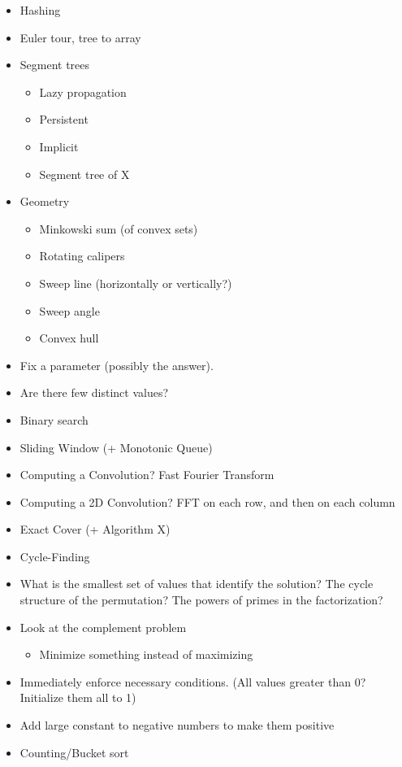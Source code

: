 \documentclass[9pt,a4paper,landscape,oneside]{amsart}
\newenvironment{myitemize}
{\begin{itemize}[leftmargin=.3cm]
	\setlength{\itemsep}{0pt}
	\setlength{\parskip}{0pt}
	\setlength{\parsep}{0pt}     }
{ \end{itemize}                  }
\begin{document}
\begin{multicols*}{3}
\begin{myitemize}
\begin{myitemize}
			\item Trie (maybe over something weird, like bits)
			\item Suffix array
			\item Suffix automaton (+DP?)
			\item Aho-Corasick
			\item eerTree
			\item Work with $S+S$
		\end{myitemize}
	\item Hashing
	\item Euler tour, tree to array
	\item Segment trees
		\begin{myitemize}
			\item Lazy propagation
			\item Persistent
			\item Implicit
			\item Segment tree of X
		\end{myitemize}
	\item Geometry
		\begin{myitemize}
			\item Minkowski sum (of convex sets)
			\item Rotating calipers
			\item Sweep line (horizontally or vertically?)
			\item Sweep angle
			\item Convex hull
		\end{myitemize}
	\item Fix a parameter (possibly the answer).
	\item Are there few distinct values?
	\item Binary search
	\item Sliding Window (+ Monotonic Queue)
	\item Computing a Convolution? Fast Fourier Transform
	\item Computing a 2D Convolution? FFT on each row, and then on each column
	\item Exact Cover (+ Algorithm X)
	\item Cycle-Finding
	\item What is the smallest set of values that identify the solution? The cycle structure of the permutation? The powers of primes in the factorization?
	\item Look at the complement problem
		\begin{myitemize}
			\item Minimize something instead of maximizing
		\end{myitemize}
	\item Immediately enforce necessary conditions. (All values greater than 0? Initialize them all to 1)
	\item Add large constant to negative numbers to make them positive
	\item Counting/Bucket sort
\end{myitemize}


\end{multicols*}
\end{document}
